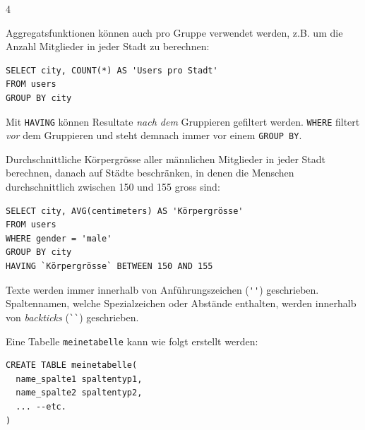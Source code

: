 \begin{landscape}
\begin{multicols*}{4}
\begin{cheatSheetBox}[title=Gruppieren: \texorpdfstring{\lstinline|GROUP BY|}{GROUP BY}]
Aggregatsfunktionen können auch pro Gruppe verwendet werden, z.B. um die Anzahl Mitglieder in jeder Stadt zu berechnen:
\begin{lstlisting}
SELECT city, COUNT(*) AS 'Users pro Stadt'
FROM users
GROUP BY city
\end{lstlisting}
\end{cheatSheetBox}

\begin{cheatSheetBox}[title=Filtern \textit{nach} Gruppieren: \texorpdfstring{\lstinline|HAVING|}{HAVING}]
Mit \lstinline|HAVING| können Resultate \textit{nach dem} Gruppieren gefiltert werden. \lstinline|WHERE| filtert \textit{vor} dem Gruppieren und steht demnach immer vor einem \lstinline|GROUP BY|.

Durchschnittliche Körpergrösse aller männlichen Mitglieder in jeder Stadt berechnen, danach auf Städte beschränken, in denen die Menschen durchschnittlich zwischen 150 und 155 gross sind:

\begin{lstlisting}
SELECT city, AVG(centimeters) AS 'Körpergrösse'
FROM users
WHERE gender = 'male'
GROUP BY city
HAVING `Körpergrösse` BETWEEN 150 AND 155
\end{lstlisting}
\end{cheatSheetBox}
Texte werden immer innerhalb von Anführungszeichen (\lstinline|''|) geschrieben. Spaltennamen, welche Spezialzeichen oder Abstände enthalten, werden innerhalb von \textit{backticks} (\lstinline|``|) geschrieben.

\clearpage
\begin{cheatSheetBox}[title=Tabellen erstellen: \texorpdfstring{\lstinline|CREATE TABLE|}{CREATE TABLE}]
Eine Tabelle \texttt{meinetabelle} kann wie folgt erstellt werden:
\begin{lstlisting}
CREATE TABLE meinetabelle(
  name_spalte1 spaltentyp1,
  name_spalte2 spaltentyp2,
  ... --etc.
)


\end{lstlisting}
\end{cheatSheetBox}
\end{multicols*}
\end{landscape}
